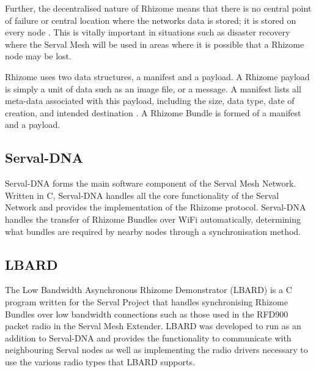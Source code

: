 Further, the decentralised nature of Rhizome means that there is no central point of failure or central location where the networks data is stored; it is stored on every node \parencite{servalWiFiMultiModel}.
This is vitally important in situations such as disaster recovery where the Serval Mesh will be used in areas where it is possible that a Rhizome node may be lost.

Rhizome uses two data structures, a manifest and a payload.
A Rhizome payload is simply a unit of data such as an image file, or a message.
A manifest lists all meta-data associated with this payload, including the size, data type, date of creation, and intended destination \parencite{servalProject2011}.
A Rhizome Bundle is formed of a manifest and a payload. 


\subsection{Serval-DNA}
Serval-DNA forms the main software component of the Serval Mesh Network.
Written in C, Serval-DNA handles all the core functionality of the Serval Network and provides the implementation of the Rhizome protocol. \parencite{servalMesh2013}
Serval-DNA handles the transfer of Rhizome Bundles over WiFi automatically, determining what bundles are required by nearby nodes through a synchronisation method.



\subsection{LBARD}
The Low Bandwidth Asynchronous Rhizome Demonstrator (LBARD) is a C program written for the Serval Project that handles synchronising Rhizome Bundles over low bandwidth connections such as those used in the RFD900 packet radio in the Serval Mesh Extender.
LBARD was developed to run as an addition to Serval-DNA and provides the functionality to communicate with neighbouring Serval nodes as well as implementing the radio drivers necessary to use the various radio types that LBARD supports.


